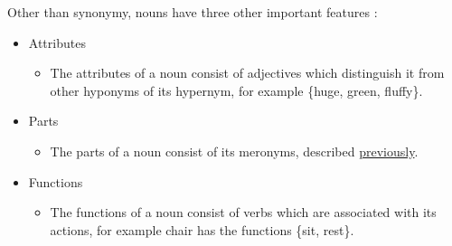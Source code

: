 \documentclass[]{article}
\begin{document}
Other than synonymy, nouns have three other important features \cite{WN2Nouns}:
\begin{itemize}
	\item Attributes
	\begin{itemize}
		\item The attributes of a noun consist of adjectives which distinguish it from other hyponyms of its hypernym, for example \{huge, green, fluffy\}.
	\end{itemize}		
	
	\item Parts
	\begin{itemize}
		\item The parts of a noun consist of its meronyms, described \hyperref[Meronym]{previously}.
	\end{itemize}		
	
	\item Functions
	\begin{itemize}
		\item The functions of a noun consist of verbs which are associated with its actions, for example chair has the functions \{sit, rest\}.
	\end{itemize}		
	
\end{itemize}
\end{document}
